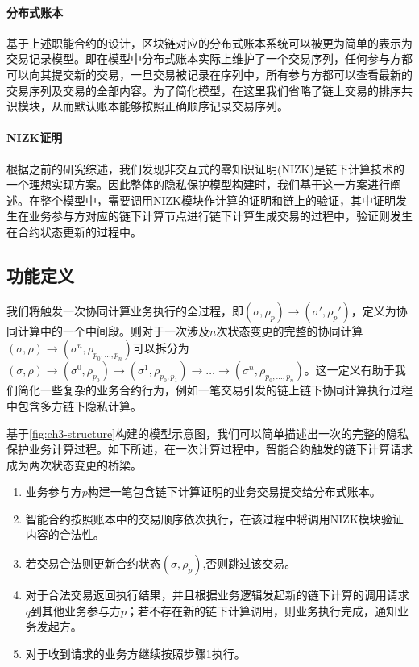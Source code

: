 \paragraph{分布式账本} 基于上述职能合约的设计，区块链对应的分布式账本系统可以被更为简单的表示为交易记录模型。即在模型中分布式账本实际上维护了一个交易序列，任何参与方都可以向其提交新的交易，一旦交易被记录在序列中，所有参与方都可以查看最新的交易序列及交易的全部内容。为了简化模型，在这里我们省略了链上交易的排序共识模块，从而默认账本能够按照正确顺序记录交易序列。

\paragraph{NIZK证明} 根据之前的研究综述，我们发现非交互式的零知识证明(NIZK)是链下计算技术的一个理想实现方案。因此整体的隐私保护模型构建时，我们基于这一方案进行阐述。在整个模型中，需要调用NIZK模块作计算的证明和链上的验证，其中证明发生在业务参与方对应的链下计算节点进行链下计算生成交易的过程中，验证则发生在合约状态更新的过程中。

\subsection{功能定义}
我们将触发一次协同计算业务执行的全过程，即$(\sigma, \rho_\mathit{p})\rightarrow(\sigma', \rho_\mathit{p}')$，定义为协同计算中的一个中间段。则对于一次涉及$n$次状态变更的完整的协同计算$(\sigma, \rho)\rightarrow(\sigma^n, \rho_{p_0,\dots,p_n})$可以拆分为$(\sigma, \rho)\rightarrow(\sigma^0, \rho_{p_0})\rightarrow(\sigma^1, \rho_{p_0,p_1})\rightarrow \dots \rightarrow (\sigma^n, \rho_{p_0,\dots,p_n})$。这一定义有助于我们简化一些复杂的业务合约行为，例如一笔交易引发的链上链下协同计算执行过程中包含多方链下隐私计算。

基于\autoref{fig:ch3-structure}构建的模型示意图，我们可以简单描述出一次的完整的隐私保护业务计算过程。如下所述，在一次计算过程中，智能合约触发的链下计算请求成为两次状态变更的桥梁。
\begin{enumerate}
    \setlength{\itemsep}{0pt}
    \setlength{\parsep}{0pt}
    \setlength{\parskip}{0pt}
\item 业务参与方$p$构建一笔包含链下计算证明的业务交易提交给分布式账本。
\item 智能合约按照账本中的交易顺序依次执行，在该过程中将调用NIZK模块验证内容的合法性。
\item 若交易合法则更新合约状态$(\sigma, \rho_p)$,否则跳过该交易。
\item 对于合法交易返回执行结果，并且根据业务逻辑发起新的链下计算的调用请求$\mathit{q}$到其他业务参与方$p$；若不存在新的链下计算调用，则业务执行完成，通知业务发起方。
\item 对于收到请求的业务方继续按照步骤1执行。
\end{enumerate}

